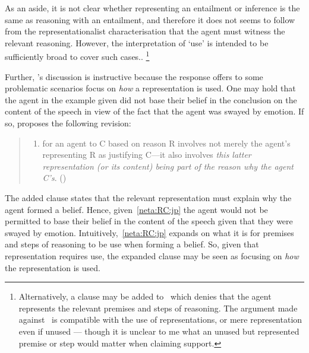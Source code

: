 \begin{note}[Representationalism]
  As an aside, it is not clear whether representing an entailment or inference is the same as reasoning with an entailment, and therefore it does not seems to follow from the representationalist characterisation that the agent must witness the relevant reasoning.
  However, the interpretation of `use' is intended to be sufficiently broad to cover such cases..\nolinebreak
  \footnote{
    Alternatively, a clause may be added to~\ESU{} which denies that the agent represents the relevant premises and steps of reasoning.
    The argument made against~\ESU{} is compatible with the use of representations, or mere representation even if unused --- though it is unclear to me what an unused but represented premise or step would matter when claiming support.
  }

  Further, \citeauthor{Neta:2019aa}'s discussion is instructive because the response \citeauthor{Neta:2019aa} offers to some problematic scenarios focus on \emph{how} a representation is used.
  One may hold that the agent in the example given did not base their belief in the conclusion on the content of the speech in view of the fact that the agent was swayed by emotion.
  If so, \citeauthor{Neta:2019aa} proposes the following revision:
  \begin{quote}
    \begin{enumerate}[label=(R\arabic*\('\)), ref=(R\arabic*\('\))]
    \item\label{neta:RC:jp} for an agent to C based on reason R involves not merely the agent's representing R as justifying C---it also involves \emph{this latter representation (or its content) being part of the reason why the agent C's}.\nolinebreak
      \mbox{}\hfill\mbox{(\citeyear[197]{Neta:2019aa})}
    \end{enumerate}
  \end{quote}
  The added clause states that the relevant representation must explain why the agent formed a belief.
  Hence, given~\ref{neta:RC:jp} the agent would not be permitted to base their belief in the content of the speech given that they were swayed by emotion.
  Intuitively,~\ref{neta:RC:jp} expands on what it is for premises and steps of reasoning to be use when forming a belief.
  So, given that representation requires use, the expanded clause may be seen as focusing on \emph{how} the representation is used.
\end{note}

